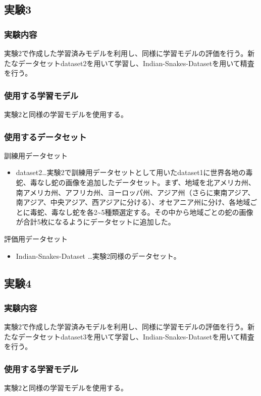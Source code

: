 \documentclass[a4paper, 11pt, titlepage]{jsarticle}
\begin{document}
\subsection{実験3}
\subsubsection{実験内容}
実験2で作成した学習済みモデルを利用し、同様に学習モデルの評価を行う。新たなデータセットdataset2を用いて学習し、Indian-Snakes-Datasetを用いて精査を行う。
\subsubsection{使用する学習モデル}
実験2と同様の学習モデルを使用する。
\subsubsection{使用するデータセット}
訓練用データセット
\begin{itemize}
\item dataset2…実験2で訓練用データセットとして用いたdataset1に世界各地の毒蛇、毒なし蛇の画像を追加したデータセット。まず、地域を北アメリカ州、南アメリカ州、アフリカ州、ヨーロッパ州、アジア州（さらに東南アジア、南アジア、中央アジア、西アジアに分ける）、オセアニア州に分け、各地域ごとに毒蛇、毒なし蛇を各2\textasciitilde5種類選定する。その中から地域ごとの蛇の画像が合計5枚になるようにデータセットに追加した。
\end{itemize}\par
評価用データセット
\begin{itemize}
\item Indian-Snakes-Dataset …実験2同様のデータセット。
\end{itemize}

\subsection{実験4}
\subsubsection{実験内容}
実験2で作成した学習済みモデルを利用し、同様に学習モデルの評価を行う。新たなデータセットdataset3を用いて学習し、Indian-Snakes-Datasetを用いて精査を行う。
\subsubsection{使用する学習モデル}
実験2と同様の学習モデルを使用する。
\end{document}
